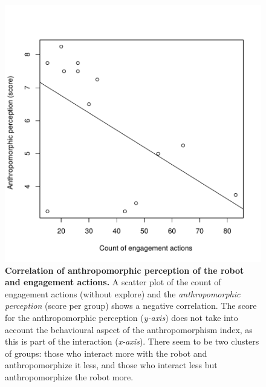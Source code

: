 \documentclass{sig-alternate}
\begin{document}
\begin{figure}[t]
    \centering
    \includegraphics[width=0.8\columnwidth]{domino-correlation.pdf}   

    \caption[Correlation of Anthropomorphic Perception of the Robot and
    Interaction]{\small \textbf{Correlation of anthropomorphic perception of the
    robot and engagement actions.} A scatter plot of the count of engagement
    actions (without explore) and the \textit{anthropomorphic perception} (score per
    group) shows a negative correlation. The score for the anthropomorphic
    perception (\textit{y-axis}) does not take into account the behavioural aspect of
    the anthropomorphism index, as this is part of the interaction
    (\textit{x-axis}).  There seem to be two clusters of groups: those who interact
    more with the robot and anthropomorphize it less, and those who interact less
    but anthropomorphize the robot more.}

    \label{fig:domino-anthropo-interaction}
\end{figure}	

\end{document}
